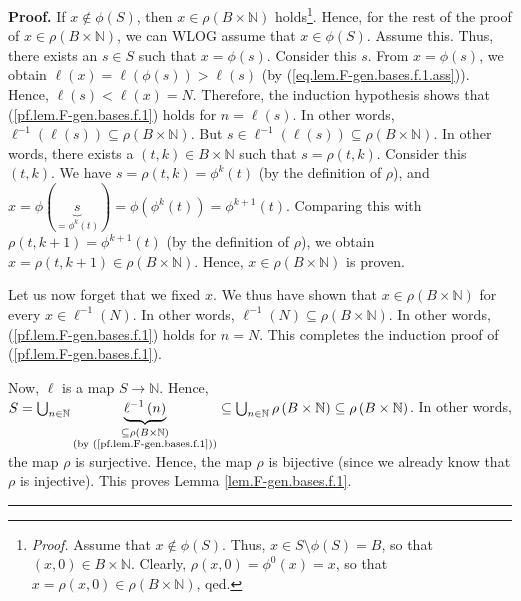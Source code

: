 \documentclass[numbers=enddot,12pt,final,onecolumn,notitlepage]{scrartcl}%
\theoremstyle{definition}
\newenvironment{proof}[1][Proof]{\noindent\textbf{#1.} }{\ \rule{0.5em}{0.5em}}
\begin{document}
\begin{proof}
If $x\notin\phi\left(  S\right)  $, then $x\in\rho\left(  B\times
\mathbb{N}\right)  $ holds\footnote{\textit{Proof.} Assume that $x\notin%
\phi\left(  S\right)  $. Thus, $x\in S\setminus\phi\left(  S\right)  =B$, so
that $\left(  x,0\right)  \in B\times\mathbb{N}$. Clearly, $\rho\left(
x,0\right)  =\phi^{0}\left(  x\right)  =x$, so that $x=\rho\left(  x,0\right)
\in\rho\left(  B\times\mathbb{N}\right)  $, qed.}. Hence, for the rest of the
proof of $x\in\rho\left(  B\times\mathbb{N}\right)  $, we can WLOG assume that
$x\in\phi\left(  S\right)  $. Assume this. Thus, there exists an $s\in S$ such
that $x=\phi\left(  s\right)  $. Consider this $s$. From $x=\phi\left(
s\right)  $, we obtain $\ell\left(  x\right)  =\ell\left(  \phi\left(
s\right)  \right)  >\ell\left(  s\right)  $ (by
(\ref{eq.lem.F-gen.bases.f.1.ass})). Hence, $\ell\left(  s\right)
<\ell\left(  x\right)  =N$. Therefore, the induction hypothesis shows that
(\ref{pf.lem.F-gen.bases.f.1}) holds for $n=\ell\left(  s\right)  $. In other
words, $\ell^{-1}\left(  \ell\left(  s\right)  \right)  \subseteq\rho\left(
B\times\mathbb{N}\right)  $. But $s\in\ell^{-1}\left(  \ell\left(  s\right)
\right)  \subseteq\rho\left(  B\times\mathbb{N}\right)  $. In other words,
there exists a $\left(  t,k\right)  \in B\times\mathbb{N}$ such that
$s=\rho\left(  t,k\right)  $. Consider this $\left(  t,k\right)  $. We have
$s=\rho\left(  t,k\right)  =\phi^{k}\left(  t\right)  $ (by the definition of
$\rho$), and $x=\phi\left(  \underbrace{s}_{=\phi^{k}\left(  t\right)
}\right)  =\phi\left(  \phi^{k}\left(  t\right)  \right)  =\phi^{k+1}\left(
t\right)  $. Comparing this with $\rho\left(  t,k+1\right)  =\phi^{k+1}\left(
t\right)  $ (by the definition of $\rho$), we obtain $x=\rho\left(
t,k+1\right)  \in\rho\left(  B\times\mathbb{N}\right)  $. Hence, $x\in
\rho\left(  B\times\mathbb{N}\right)  $ is proven.

Let us now forget that we fixed $x$. We thus have shown that $x\in\rho\left(
B\times\mathbb{N}\right)  $ for every $x\in\ell^{-1}\left(  N\right)  $. In
other words, $\ell^{-1}\left(  N\right)  \subseteq\rho\left(  B\times
\mathbb{N}\right)  $. In other words, (\ref{pf.lem.F-gen.bases.f.1}) holds for
$n=N$. This completes the induction proof of (\ref{pf.lem.F-gen.bases.f.1}).

Now, $\ell$ is a map $S\rightarrow\mathbb{N}$. Hence, $S=\bigcup
_{n\in\mathbb{N}}\underbrace{\ell^{-1}\left(  n\right)  }_{\substack{\subseteq
\rho\left(  B\times\mathbb{N}\right)  \\\text{(by
(\ref{pf.lem.F-gen.bases.f.1}))}}}\subseteq\bigcup_{n\in\mathbb{N}}\rho\left(
B\times\mathbb{N}\right)  \subseteq\rho\left(  B\times\mathbb{N}\right)  $. In
other words, the map $\rho$ is surjective. Hence, the map $\rho$ is bijective
(since we already know that $\rho$ is injective). This proves Lemma
\ref{lem.F-gen.bases.f.1}.
\end{proof}
\end{document}
